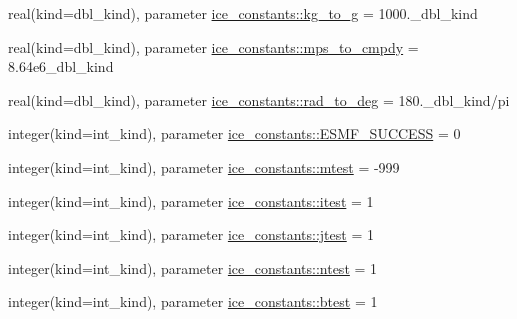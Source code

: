 \begin{DoxyCompactItemize}
real(kind=dbl\_\-kind), parameter \hyperlink{namespaceice__constants_a8521dc2c82ea56e569469e82ad4780e2}{ice\_\-constants::kg\_\-to\_\-g} = 1000.\_\-dbl\_\-kind
\item 
real(kind=dbl\_\-kind), parameter \hyperlink{namespaceice__constants_a0fed58f0622b835fd2cb734144ac46c7}{ice\_\-constants::mps\_\-to\_\-cmpdy} = 8.64e6\_\-dbl\_\-kind
\item 
real(kind=dbl\_\-kind), parameter \hyperlink{namespaceice__constants_a499282766889f13defe6ffd6c7aa1216}{ice\_\-constants::rad\_\-to\_\-deg} = 180.\_\-dbl\_\-kind/pi
\item 
integer(kind=int\_\-kind), parameter \hyperlink{namespaceice__constants_a44cb6638bc9a0baa694a335b146e14f7}{ice\_\-constants::ESMF\_\-SUCCESS} = 0
\item 
integer(kind=int\_\-kind), parameter \hyperlink{namespaceice__constants_a8da957fd440b5e1713582e19da3590cf}{ice\_\-constants::mtest} = -\/999
\item 
integer(kind=int\_\-kind), parameter \hyperlink{namespaceice__constants_af78b1568368337f01e89d12111f68e2e}{ice\_\-constants::itest} = 1
\item 
integer(kind=int\_\-kind), parameter \hyperlink{namespaceice__constants_ac7e42098d3809e659df8da6e3fe54368}{ice\_\-constants::jtest} = 1
\item 
integer(kind=int\_\-kind), parameter \hyperlink{namespaceice__constants_a27deecaf56e53c5ea7ceb62b33d530d6}{ice\_\-constants::ntest} = 1
\item 
integer(kind=int\_\-kind), parameter \hyperlink{namespaceice__constants_ab190c42f5dcb2a1569301158e2066f5b}{ice\_\-constants::btest} = 1
\end{DoxyCompactItemize}
